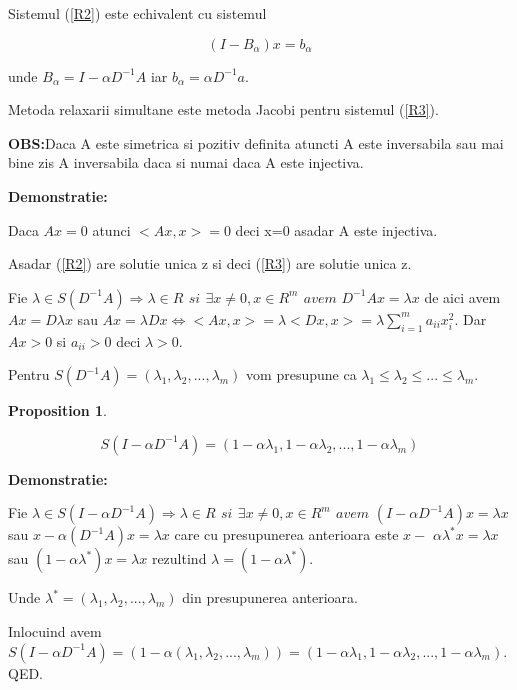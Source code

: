 \documentclass[a4paper,twoside]{book}
\newtheorem{proposition}[theorem]{Proposition}
\begin{document}
Sistemul (\ref{R2}) este echivalent cu sistemul

\begin{equation}
(I-B_{\alpha })x=b_{\alpha }  \label{R3}
\end{equation}

unde $B_{\alpha }=I-\alpha D^{-1}A$ iar $b_{\alpha }=\alpha D^{-1}a$.

Metoda relaxarii simultane este metoda Jacobi pentru sistemul (\ref{R3}).

\textbf{OBS:}Daca A este simetrica si pozitiv definita atuncti A este
inversabila sau mai bine zis A inversabila daca si numai daca A este
injectiva.

\textbf{Demonstratie:}

\qquad Daca $Ax=0$ atunci $<Ax,x>=0$ deci x=0 asadar A este injectiva.

Asadar (\ref{R2}) are solutie unica z si deci (\ref{R3}) are solutie unica z.

Fie $\lambda \in S(D^{-1}A)\Rightarrow \lambda \in R\,\ si\,\ \exists x\neq
0,x\in R^{m}\,\ avem\,\,D^{-1}Ax=\lambda x$ de aici avem $Ax=D\lambda x$ sau 
$Ax=\lambda Dx\Leftrightarrow <Ax,x>=\lambda <Dx,x>=\lambda
\sum_{i=1}^{m}a_{ii}x_{i}^{2}.$ Dar $Ax>0$ si $a_{ii}>0$ deci $\lambda >0$.

Pentru $S(D^{-1}A)=(\lambda _{1},\lambda _{2},...,\lambda _{m})$ vom
presupune ca $\lambda _{1}\leq \lambda _{2}\leq ...\leq \lambda _{m}$.

\begin{proposition}
\label{REL_2}
\end{proposition}

\begin{equation*}
S(I-\alpha D^{-1}A)=(1-\alpha \lambda _{1},1-\alpha \lambda
_{2},...,1-\alpha \lambda _{m})
\end{equation*}

\textbf{Demonstratie:}

Fie $\lambda \in S(I-\alpha D^{-1}A)\Rightarrow \lambda \in R\,\ si\,\
\exists x\neq 0,x\in R^{m}\,\ avem\,\,(I-\alpha D^{-1}A)x=\lambda x$ sau $%
x-\alpha (D^{-1}A)x=\lambda x$ care cu presupunerea anterioara este $x-$ $%
\alpha \lambda ^{\ast }x=\lambda x$ sau $(1-\alpha \lambda ^{\ast
})x=\lambda x$ rezultind $\lambda =(1-\alpha \lambda ^{\ast })$.

Unde $\lambda ^{\ast }=(\lambda _{1},\lambda _{2},...,\lambda _{m})$ din
presupunerea anterioara.

Inlocuind avem $S(I-\alpha D^{-1}A)=(1-\alpha (\lambda _{1},\lambda
_{2},...,\lambda _{m}))=(1-\alpha \lambda _{1},1-\alpha \lambda
_{2},...,1-\alpha \lambda _{m})$. QED.
\end{document}
